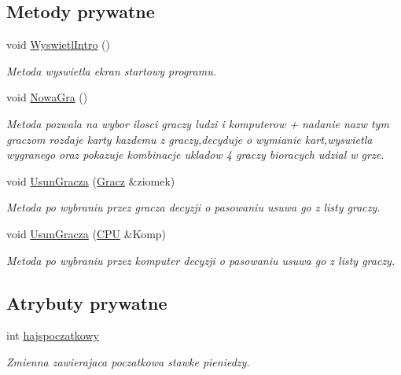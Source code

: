 \subsection*{Metody prywatne}
\begin{DoxyCompactItemize}
\item 
void \hyperlink{class_interfejs_a8ff83444a040a2bd40e2b1a3d2e10e05}{Wyswietl\-Intro} ()
\begin{DoxyCompactList}\small\item\em Metoda wyswietla ekran startowy programu. \end{DoxyCompactList}\item 
void \hyperlink{class_interfejs_af26c144e5225856535e91bc51c6edeac}{Nowa\-Gra} ()
\begin{DoxyCompactList}\small\item\em Metoda pozwala na wybor ilosci graczy ludzi i komputerow + nadanie nazw tym graczom rozdaje karty kazdemu z graczy,decyduje o wymianie kart,wyswietla wygranego oraz pokazuje kombinacje ukladow 4 graczy bioracych udzial w grze. \end{DoxyCompactList}\item 
void \hyperlink{class_interfejs_a65cdf5c6927e442bd60658a9077f751e}{Usun\-Gracza} (\hyperlink{class_gracz}{Gracz} \&ziomek)
\begin{DoxyCompactList}\small\item\em Metoda po wybraniu przez gracza decyzji o pasowaniu usuwa go z listy graczy. \end{DoxyCompactList}\item 
void \hyperlink{class_interfejs_ac3f1f271790f6f2f0851b96f4322dbfd}{Usun\-Gracza} (\hyperlink{class_c_p_u}{C\-P\-U} \&Komp)
\begin{DoxyCompactList}\small\item\em Metoda po wybraniu przez komputer decyzji o pasowaniu usuwa go z listy graczy. \end{DoxyCompactList}\end{DoxyCompactItemize}
\subsection*{Atrybuty prywatne}
\begin{DoxyCompactItemize}
\item 
int \hyperlink{class_interfejs_a79c7d1ef2820f5d5104ab91b691d6189}{hajspoczatkowy}
\begin{DoxyCompactList}\small\item\em Zmienna zawierajaca poczatkowa stawke pieniedzy. \end{DoxyCompactList}\end{DoxyCompactItemize}


